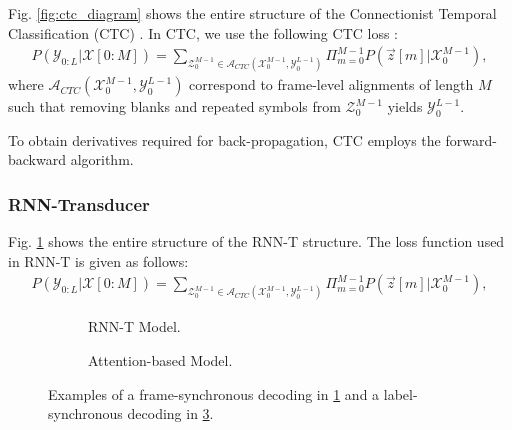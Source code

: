 \documentclass{article}
\begin{document}
Fig. \ref{fig:ctc_diagram} shows the entire structure of the 
Connectionist Temporal Classification (CTC) 
\cite{a_graves_icml_2006_00}. In CTC, we use the following CTC loss
\cite{a_graves_icml_2006_00, y_he_icassp_2019_00}:
\begin{align}
  P\left(\mathcal{Y}_{0:L} | \mathcal{X}[0:M]\right) = 
    \sum_{\mathcal{Z}_{0}^{M-1} \in 
      \mathcal{A}_{CTC} 
        \left(\mathcal{X}_{0}^{M-1}, \mathcal{Y}_{0}^{L-1} \right)}
          \Pi_{m=0}^{M-1}
            P\left(\vec{z}[m] | \mathcal{X}_{0}^{M-1} \right),
\end{align}
where $\mathcal{A}_{CTC} \left(\mathcal{X}_{0}^{M-1}, 
\mathcal{Y}_{0}^{L-1} \right)$ correspond to frame-level alignments
of length $M$ such that removing blanks and repeated symbols from 
$\mathcal{Z}_{0}^{M-1}$ yields $\mathcal{Y}_{0}^{L-1}$.

To obtain derivatives required for back-propagation, CTC employs 
the forward-backward algorithm.



\subsubsection{RNN-Transducer}
\label{sec:rnn_t}

Fig. \ref{fig:rnn_t_diagram} shows the entire structure of the  
RNN-T structure. The loss function used in RNN-T is given as follows:
\begin{align}
  P\left(\mathcal{Y}_{0:L} | \mathcal{X}[0:M]\right) = 
    \sum_{\mathcal{Z}_{0}^{M-1} \in 
      \mathcal{A}_{CTC} 
        \left(\mathcal{X}_{0}^{M-1}, \mathcal{Y}_{0}^{L-1} \right)}
          \Pi_{m=0}^{M-1}
            P\left(\vec{z}[m] | \mathcal{X}_{0}^{M-1} \right),
\end{align}


\begin{figure}
  \centering
  \begin{subfigure}[b]{0.50\textwidth}
    \centering
    \resizebox{70mm}{!}{
      
    }
    \caption {
      RNN-T Model.
      \label{fig:rnn_t_diagram}
    }
  \end{subfigure}
  \begin{subfigure}[b]{0.45\textwidth}
    \centering
    \resizebox{55mm}{!}{
      
    }
    \caption {
      Attention-based Model.
      \label{fig:attention_diagram}
    }
  \end{subfigure}
  \caption{
    Examples of a frame-synchronous decoding in \ref{fig:rnn_t_diagram}
    and a label-synchronous decoding in \ref{fig:attention_diagram}.
  }

\end{figure}
\end{document}

